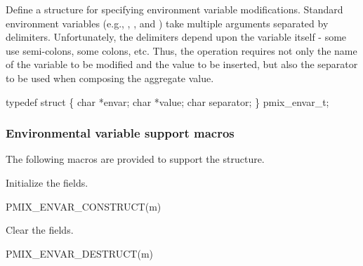 Define a structure for specifying environment variable modifications.
Standard environment variables (e.g., , , and )
take multiple arguments separated by delimiters. Unfortunately, the delimiters
depend upon the variable itself - some use semi-colons, some colons, etc. Thus,
the operation requires not only the name of the variable to be modified and
the value to be inserted, but also the separator to be used when composing
the aggregate value.

\cspecificstart
\begin{codepar}
typedef struct \{
    char *envar;
    char *value;
    char separator;
\} pmix_envar_t;
\end{codepar}
\cspecificend

\subsubsection{Environmental variable support macros}

The following macros are provided to support the  structure.


Initialize the  fields.

\cspecificstart
\begin{codepar}
PMIX_ENVAR_CONSTRUCT(m)
\end{codepar}
\cspecificend

\begin{arglist}
\end{arglist}


Clear the  fields.

\cspecificstart
\begin{codepar}
PMIX_ENVAR_DESTRUCT(m)
\end{codepar}
\cspecificend

\begin{arglist}
\end{arglist}


